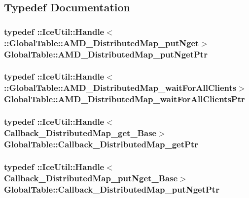 \subsection{Typedef Documentation}
\hypertarget{namespace_global_table_a428cb1ad01dcd657dfcfef5d25f3ac5a}{
\subsubsection[{AMD\_\-DistributedMap\_\-putNgetPtr}]{\setlength{\rightskip}{0pt plus 5cm}typedef ::IceUtil::Handle$<$ ::{\bf GlobalTable::AMD\_\-DistributedMap\_\-putNget}$>$ {\bf GlobalTable::AMD\_\-DistributedMap\_\-putNgetPtr}}}
\label{namespace_global_table_a428cb1ad01dcd657dfcfef5d25f3ac5a}
\hypertarget{namespace_global_table_af3e96d293fa3f6f274f78b841b3c3097}{
\subsubsection[{AMD\_\-DistributedMap\_\-waitForAllClientsPtr}]{\setlength{\rightskip}{0pt plus 5cm}typedef ::IceUtil::Handle$<$ ::{\bf GlobalTable::AMD\_\-DistributedMap\_\-waitForAllClients}$>$ {\bf GlobalTable::AMD\_\-DistributedMap\_\-waitForAllClientsPtr}}}
\label{namespace_global_table_af3e96d293fa3f6f274f78b841b3c3097}
\hypertarget{namespace_global_table_a9ad421b8bc43ec4b2173407f2bed7ecc}{
\subsubsection[{Callback\_\-DistributedMap\_\-getPtr}]{\setlength{\rightskip}{0pt plus 5cm}typedef ::IceUtil::Handle$<$ {\bf Callback\_\-DistributedMap\_\-get\_\-Base}$>$ {\bf GlobalTable::Callback\_\-DistributedMap\_\-getPtr}}}
\label{namespace_global_table_a9ad421b8bc43ec4b2173407f2bed7ecc}
\hypertarget{namespace_global_table_afeefcdd5dfb862806549e834b8727011}{
\subsubsection[{Callback\_\-DistributedMap\_\-putNgetPtr}]{\setlength{\rightskip}{0pt plus 5cm}typedef ::IceUtil::Handle$<$ {\bf Callback\_\-DistributedMap\_\-putNget\_\-Base}$>$ {\bf GlobalTable::Callback\_\-DistributedMap\_\-putNgetPtr}}}
